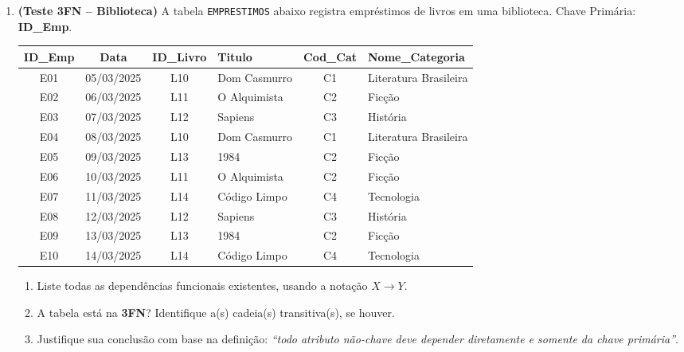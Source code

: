 \documentclass[12pt]{article}
\begin{document}
\begin{enumerate}[label=\textbf{Questão \arabic*:}, leftmargin=*]


  \item \textbf{(Teste 3FN -- Biblioteca)} A tabela \texttt{EMPRESTIMOS} abaixo registra empréstimos de livros em uma biblioteca. Chave Primária: \textbf{ID\_Emp}.
  \small
  \vspace{0.2cm}
  \centering
  \begin{tabular}{|c|c|c|l|c|l|}
    \hline
    \textbf{ID\_Emp} & \textbf{Data} & \textbf{ID\_Livro} & \textbf{Titulo} & \textbf{Cod\_Cat} & \textbf{Nome\_Categoria} \\ \hline
    E01 & 05/03/2025 & L10 & Dom Casmurro         & C1 & Literatura Brasileira \\ \hline
    E02 & 06/03/2025 & L11 & O Alquimista          & C2 & Ficção                \\ \hline
    E03 & 07/03/2025 & L12 & Sapiens               & C3 & História              \\ \hline
    E04 & 08/03/2025 & L10 & Dom Casmurro         & C1 & Literatura Brasileira \\ \hline
    E05 & 09/03/2025 & L13 & 1984                  & C2 & Ficção                \\ \hline
    E06 & 10/03/2025 & L11 & O Alquimista          & C2 & Ficção                \\ \hline
    E07 & 11/03/2025 & L14 & Código Limpo          & C4 & Tecnologia            \\ \hline
    E08 & 12/03/2025 & L12 & Sapiens               & C3 & História              \\ \hline
    E09 & 13/03/2025 & L13 & 1984                  & C2 & Ficção                \\ \hline
    E10 & 14/03/2025 & L14 & Código Limpo          & C4 & Tecnologia            \\ \hline
  \end{tabular}
  \flushleft
  \vspace{0.2cm}
  \begin{enumerate}[label=\alph*)]
    \item Liste todas as dependências funcionais existentes, usando a notação $X \to Y$.
    \item A tabela está na \textbf{3FN}? Identifique a(s) cadeia(s) transitiva(s), se houver.
    \item Justifique sua conclusão com base na definição: \textit{``todo atributo não-chave deve depender diretamente e somente da chave primária''}.
  \end{enumerate}


\end{enumerate}
\end{document}
